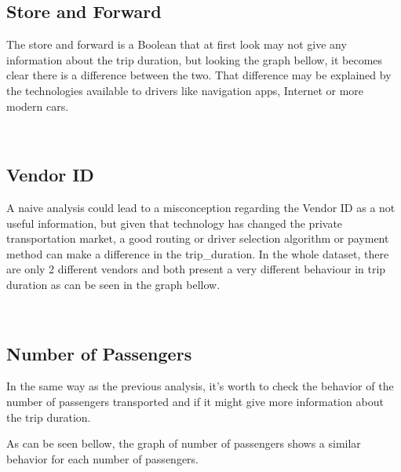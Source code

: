 \documentclass[11pt]{article}
\begin{document}
{    
    
\subsection{Store and Forward} 

The store and forward is a Boolean that at first look may not give any information about the trip duration, but looking the graph bellow, it becomes clear there is a difference between the two. That difference may be explained by the technologies available to drivers like navigation apps, Internet or more modern cars.

    \begin{center}
    \end{center}
    { \hspace*{\fill} \\}

\subsection{Vendor ID} 

A naive analysis could lead to a misconception regarding the Vendor ID as a not useful information, but given that technology has changed the private transportation market, a good routing or driver selection algorithm or payment method can make a difference in the trip_duration. In the whole dataset, there are only 2 different vendors and both present a very different behaviour in trip duration as can be seen in the graph bellow.

    \begin{center}
    \end{center}
    { \hspace*{\fill} \\}
    
\subsection{Number of Passengers} 

In the same way as the previous analysis, it's worth to check the behavior of the number of passengers transported and if it might give more information about the trip duration.

As can be seen bellow, the graph of number of passengers shows a similar behavior for each number of passengers.

}
\end{document}
